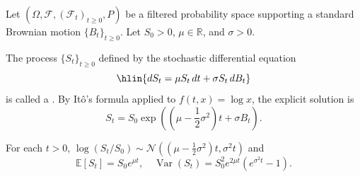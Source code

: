 \begin{definition} \label{definition:geometric_brownian_motion_on_a_filtered_probability_space}
Let $(\Omega, \mathcal{F}, (\mathcal{F}_t)_{t \geq 0}, P)$ be a filtered probability space supporting a standard Brownian motion $\{B_t\}_{t \geq 0}$. Let $S_0 > 0$, $\mu \in \mathbb{R}$, and $\sigma > 0$.

The process $\{S_t\}_{t \geq 0}$ defined by the stochastic differential equation
$$\hlin{dS_t = \mu S_t \, dt + \sigma S_t \, dB_t}$$
is called a . By Itô's formula applied to $f(t, x) = \log x$, the explicit solution is
$$S_t = S_0 \exp\left(\left(\mu - \frac{1}{2}\sigma^2\right)t + \sigma B_t\right).$$

For each $t > 0$, $\log(S_t/S_0) \sim \mathcal{N}((\mu - \tfrac{1}{2}\sigma^2)t, \sigma^2 t)$ and
$$\mathbb{E}[S_t] = S_0 e^{\mu t}, \quad \operatorname{Var}(S_t) = S_0^2 e^{2\mu t}(e^{\sigma^2 t} - 1).$$
\end{definition}
